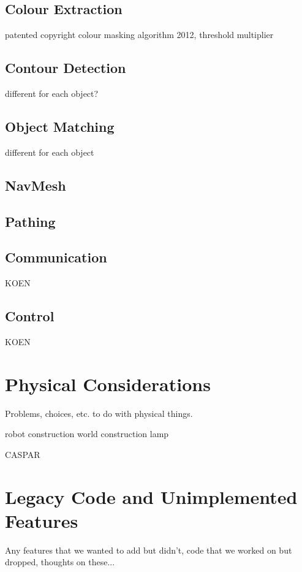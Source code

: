 \documentclass[10pt,twocolumn]{article}
\begin{document}
\subsection{Colour Extraction}

patented copyright colour masking algorithm 2012, threshold multiplier

\subsection{Contour Detection}

different for each object?

\subsection{Object Matching}

different for each object

\subsection{NavMesh}

\subsection{Pathing}

\subsection{Communication}
KOEN

\subsection{Control}
KOEN

\section{Physical Considerations}
Problems, choices, etc. to do with physical things.

robot construction
world construction
lamp

CASPAR

\section{Legacy Code and Unimplemented Features}
Any features that we wanted to add but didn't, code that we worked on but dropped, thoughts on these...
\end{document}
